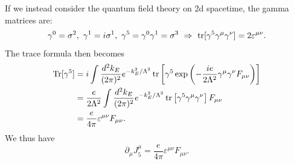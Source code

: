 If we instead consider the quantum field theory on 2d spacetime, the gamma matrices are:
\begin{equation}
	\gamma^{0}= \sigma^2,\ 
	\gamma^1 = i\sigma^1, \
	\gamma^5 = \gamma^0 \gamma^1 = \sigma^3 \ \Rightarrow \
	\tr[\gamma^5 \gamma^\mu \gamma^\nu] = 2 \varepsilon^{\mu\nu}.
\end{equation}
The trace formula then becomes
\begin{equation}
\begin{aligned}
	\operatorname{Tr}[\gamma^5] 
	&= i\int \frac{d^2 k_E}{(2\pi)^2} e^{-k_E^2/\Lambda^2}\operatorname{tr}\left[\gamma^5 \exp\left(-\frac{ie}{2\Lambda^2} \gamma^\mu \gamma^\nu F_{\mu\nu}\right)\right] \\
	&= \frac{e}{2\Lambda^2} \int \frac{d^2 k_E}{(2\pi)^2} e^{-k_E^2/\Lambda^2}\operatorname{tr}\left[\gamma^5 \gamma^\mu \gamma^\nu \right]F_{\mu\nu} \\
	&= \frac{e}{4\pi}\varepsilon^{\mu\nu}F_{\mu\nu}.
\end{aligned}
\end{equation}
We thus have
\begin{equation}
	\partial_\mu J^\mu_5 = \frac{e}{4\pi} \varepsilon^{\mu\nu} F_{\mu\nu}.
\end{equation}




